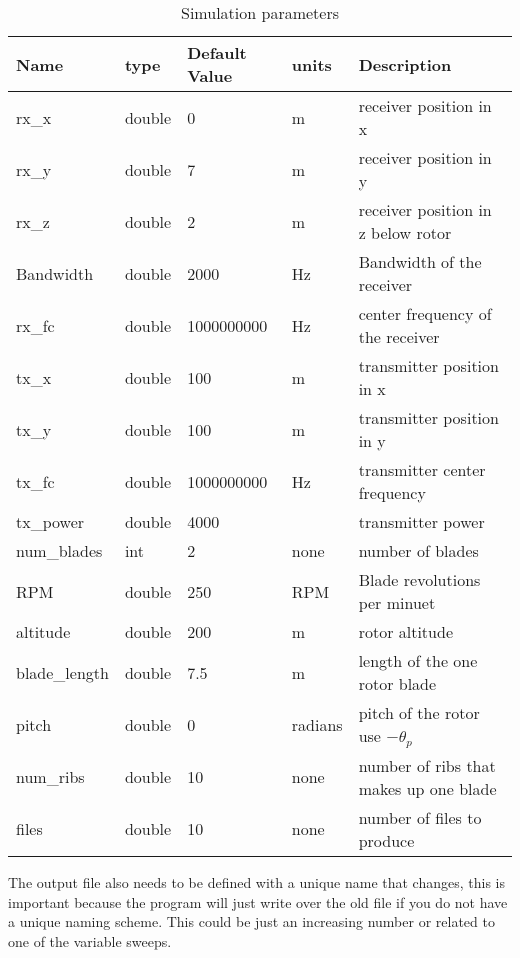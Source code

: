\begin{table}
\begin{center}
    \begin{tabular}{ | l | l | l | l | p{3cm} |}
    \hline
    Name & type & Default Value& units & Description\\ \hline
     rx\_x &  double & 0 & m & receiver position in x  \\ \hline
     rx\_y & double & 7 & m & receiver position in y \\ \hline 
     rx\_z & double & 2 & m & receiver position in z below rotor  \\ \hline
     Bandwidth & double & 2000 & Hz & Bandwidth of the receiver  \\ \hline
     rx\_fc & double & 1000000000 & Hz & center frequency of the receiver \\ \hline 
     tx\_x & double & 100 & m & transmitter position in x \\ \hline
     tx\_y & double & 100 & m & transmitter position in y \\ \hline
     tx\_fc & double & 1000000000 & Hz & transmitter center frequency \\ \hline
     tx\_power & double & 4000 & & transmitter power \\ \hline
     num\_blades & int & 2 & none & number of blades \\ \hline
     RPM & double & 250 & RPM & Blade revolutions per minuet \\ \hline
     altitude & double & 200 & m & rotor altitude \\ \hline
     blade\_length & double & 7.5 & m & length of the one rotor blade \\ \hline
     pitch & double & 0 & radians & pitch of the rotor use $-\theta_p$  \\ \hline
     num\_ribs & double & 10 & none & number of ribs that makes up one blade \\ \hline
     files & double & 10 & none & number of files to produce \\ \hline
    \end{tabular}
     \caption{Simulation parameters}
    \label{tab:key_values}
\end{center}
\end{table}
    
The output file also needs to be defined with a unique name that changes, this is important because the program will just write over the old file if you do not have a unique naming scheme. This could be just an increasing number or related to one of the variable sweeps.

